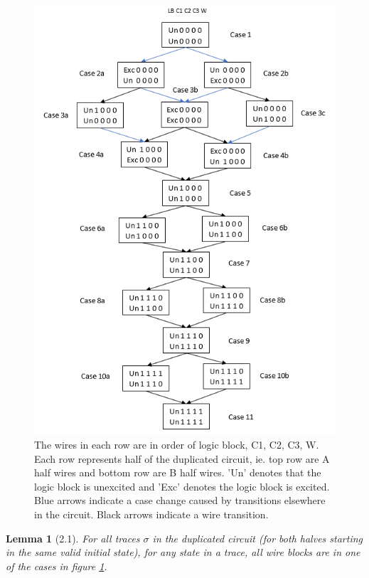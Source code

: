 \documentclass[12pt]{report}
\newtheorem*{lemma}{Lemma}
\begin{document}
\begin{figure}
  \centering
    \includegraphics{flowl2c3}
  \caption{The wires in each row are in order of logic block, C1, C2, C3, W.  Each row represents half of the duplicated circuit, ie. top row are A half wires and bottom row are B half wires.  'Un' denotes that the logic block is unexcited and 'Exc' denotes the logic block is excited.  Blue arrows indicate a case change caused by transitions elsewhere in the circuit.  Black arrows indicate a wire transition.}
  \label{fig:l21}
\end{figure}
\begin{lemma}[2.1]
For all traces $\sigma$ in the duplicated circuit (for both halves starting in the same valid initial state), for any state in a trace, all wire blocks are in one of the cases in figure \ref{fig:l21}.
\end{lemma}
\end{document}
